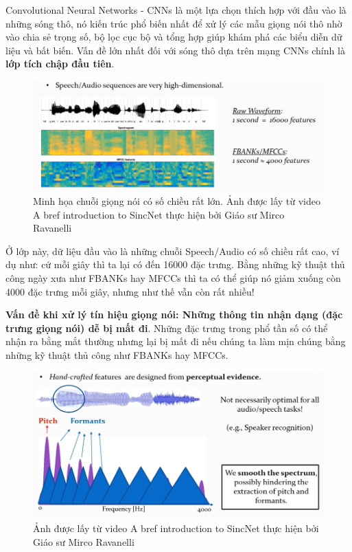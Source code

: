 \documentclass{article}
\begin{document}
	Convolutional Neural Networks - CNNs là một lựa chọn thích hợp với đầu vào là những sóng thô, nó kiến trúc phổ biến nhất để xử lý các mẫu giọng nói thô nhờ vào chia sẻ trọng số, bộ lọc cục bộ và tổng hợp giúp khám phá các biểu diễn dữ liệu và bất biến. Vấn đề lớn nhất đối với sóng thô dựa trên mạng CNNs chính là \textbf{lớp tích chập đầu tiên}.
	\begin{figure}[H]
		\centering
		\includegraphics[width=1\textwidth]{images/capture_01.png}
		\caption{Minh họa chuỗi giọng nói có số chiều rất lớn. Ảnh được lấy từ video A bref introduction to SincNet thực hiện bởi Giáo sư Mirco Ravanelli}
		\label{fig:writing-thesis}
	\end{figure}
	Ở lớp này, dữ liệu đầu vào là những chuỗi Speech/Audio có số chiều rất cao, ví dụ như: cứ mỗi giây thì ta lại có đến 16000 đặc trưng. Bằng những kỹ thuật thủ công ngày xưa như FBANKs hay MFCCs thì ta có thể giúp nó giảm xuống còn 4000 đặc trưng mỗi giây, nhưng như thế vẫn còn rất nhiều!
	
	\textbf{Vấn đề khi xử lý tín hiệu giọng nói: Những thông tin nhận dạng (đặc trưng giọng nói) dễ bị mất đi}. Những đặc trưng trong phổ tần số có thể nhận ra bằng mắt thường nhưng lại bị mất đi nếu chúng ta làm mịn chúng bằng những kỹ thuật thủ công như FBANKs hay MFCCs.
	\begin{figure}[H]
		\centering
		\includegraphics[width=1\textwidth]{images/perceptual_evidence.png}
		\caption{Ảnh được lấy từ video A bref introduction to SincNet thực hiện bởi Giáo sư Mirco Ravanelli}
		\label{fig:writing-thesis}
	\end{figure}
	
\end{document}
